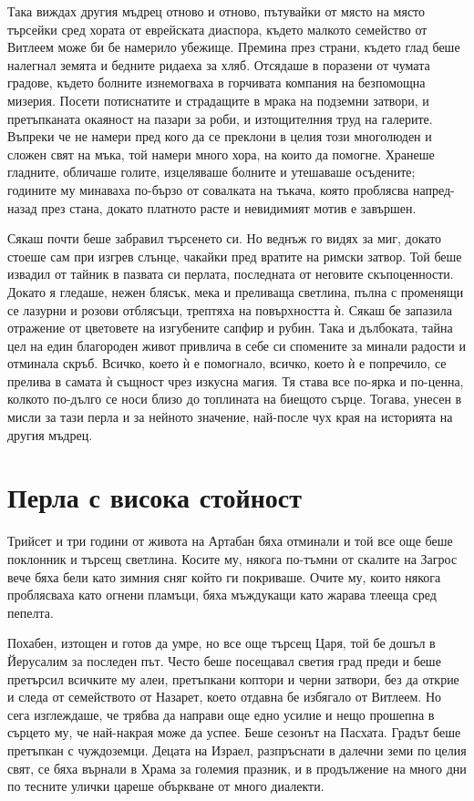 Така виждах другия мъдрец отново и отново, пътувайки от място на място търсейки
сред хората от еврейската диаспора, където малкото семейство от Витлеем може би
бе намерило убежище. Премина през страни, където глад беше налегнал земята и
бедните ридаеха за хляб. Отсядаше в поразени от чумата градове, където болните
изнемогваха в горчивата компания на безпомощна мизерия. Посети потиснатите и
страдащите в мрака на подземни затвори, и претъпканата окаяност на пазари за
роби, и изтощителния труд на галерите. Въпреки че не намери пред кого да се
преклони в целия този многолюден и сложен свят на мъка, той намери много хора,
на които да помогне. Хранеше гладните, обличаше голите, изцеляваше болните и
утешаваше осъдените; годините му минаваха по-бързо от совалката на тъкача, която
проблясва напред-назад през стана, докато платното расте и невидимият мотив е
завършен.

Сякаш почти беше забравил търсенето си. Но веднъж го видях за миг, докато стоеше
сам при изгрев слънце, чакайки пред вратите на римски затвор. Той беше извадил
от тайник в пазвата си перлата, последната от неговите скъпоценности. Докато я
гледаше, нежен блясък, мека и преливаща светлина, пълна с променящи се лазурни и
розови отблясъци, трептяха на повърхността ѝ. Сякаш бе запазила отражение от
цветовете на изгубените сапфир и рубин. Така и дълбоката, тайна цел на един
благороден живот привлича в себе си спомените за минали радости и отминала
скръб. Всичко, което ѝ е помогнало, всичко, което ѝ е попречило, се прелива в
самата ѝ същност чрез изкусна магия. Тя става все по-ярка и по-ценна, колкото
по-дълго се носи близо до топлината на биещото сърце. Тогава, унесен в мисли за
тази перла и за нейното значение, най-после чух края на историята на другия
мъдрец.

\part{Перла с висока стойност}

Трийсет и три години от живота на Артабан бяха отминали и той все още беше
поклонник и търсещ светлина. Косите му, някога по-тъмни от скалите на Загрос
вече бяха бели като зимния сняг който ги покриваше. Очите му, които някога
проблясваха като огнени пламъци, бяха мъждукащи като жарава тлееща сред пепелта.

Похабен, изтощен и готов да умре, но все още търсещ Царя, той бе дошъл в
Йерусалим за последен път. Често беше посещавал светия град преди и беше
претърсил всичките му алеи, претъпкани коптори и черни затвори, без да открие и
следа от семейството от Назарет, което отдавна бе избягало от Витлеем. Но сега
изглеждаше, че трябва да направи още едно усилие и нещо прошепна в сърцето му,
че най-накрая може да успее. Беше сезонът на Пасхата. Градът беше претъпкан с
чуждоземци. Децата на Израел, разпръснати в далечни земи по целия свят, се бяха
върнали в Храма за големия празник, и в продължение на много дни по тесните
улички цареше объркване от много диалекти.

